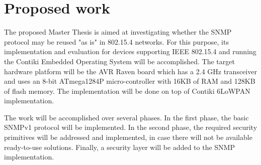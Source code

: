 \documentclass[12pt, titlepage, a4paper]{report}
\begin{document}


 

\chapter{Proposed work}\label{ch:proposal}

The proposed Master Thesis is aimed at investigating whether the SNMP protocol may be reused "as is" in 802.15.4 networks. For this purpose, its implementation and evaluation for devices supporting IEEE 802.15.4 and running the Contiki Embedded Operating System \cite{contiki} will be accomplished. The target hardware platform will be the AVR Raven board which has a 2.4 GHz transceiver and uses an 8-bit ATmega1284P micro-controller with 16KB of RAM and 128KB of flash memory. The implementation will be done on top of Contiki 6LoWPAN implementation.

The work will be accomplished over several phases. In the first phase, the basic SNMPv1 protocol will be implemented. In the second phase, the required security primitives will be addressed and implemented, in case there will not be available ready-to-use solutions. Finally, a security layer will be added to the SNMP implementation.


\newpage



\nocite{ieee802.15.4}
\nocite{eui64}
\nocite{rfc780}
\nocite{rfc2460}
\nocite{rfc2464}
\nocite{rfc2474}
\nocite{rfc3168}
\nocite{rfc3775}
\nocite{rfc4191}
\nocite{rfc4291}
\nocite{rfc4443}
\nocite{rfc4861}
\nocite{rfc4862}
\nocite{rfc4919}
\nocite{rfc4944}
\nocite{draft-usecases-05}
\nocite{draft-hc-06}
\nocite{draft-nd-07}
\nocite{draft-routing-04}
\nocite{draft-protocols-07}
\nocite{draft-rpl-04}
\nocite{draft-routing-metrics-04}
\nocite{rfc1157}
\nocite{rfc1901}
\nocite{rfc1908}
\nocite{rfc3411}
\nocite{rfc3418}
\end{document}
